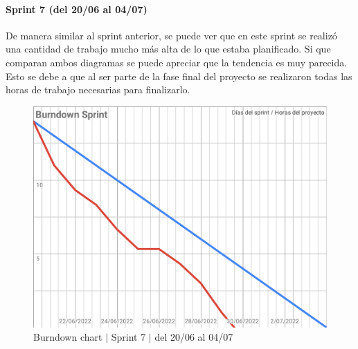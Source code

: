 \paragraph{Sprint 7 (del 20/06 al 04/07)}
De manera similar al sprint anterior, se puede ver que en este sprint se realizó una cantidad de trabajo mucho más alta de lo que estaba planificado. Si que comparan ambos diagramas se puede apreciar que la tendencia es muy parecida. Esto se debe a que al ser parte de la fase final del proyecto se realizaron todas las horas de trabajo necesarias para finalizarlo.
\begin{figure}[H]
    \centering
    \includegraphics[width=1\linewidth]{text/image/BurndownChart7.pdf}
    \caption{Burndown chart $|$ Sprint 7 $|$ del 20/06 al 04/07}
    \label{fig:burndown_chart_7}
\end{figure}

\newpage
